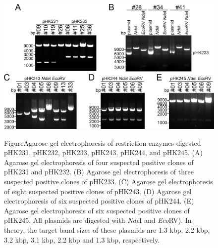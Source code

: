 \begin{figure}[hbtp!]
\centering
\graphicspath{{figures/}}
\includegraphics[width=\textwidth-50mm]{fig4-X.jpg}
{
 {Figure}{Agarose gel electrophoresis of restriction enzymes-digested pHK231, pHK232, pHK233, pHK243, pHK244, and pHK245. (A) Agarose gel electrophoresis of four suspected positive clones of pHK231 and pHK232. (B) Agarose gel electrophoresis of three suspected positive clones of pHK233. (C) Agarose gel electrophoresis of eight suspected positive clones of pHK243. (D) Agarose gel electrophoresis of six suspected positive clones of pHK244. (E) Agarose gel electrophoresis of six suspected positive clones of pHK245. All plasmids are digested with \textit{Nde}I and \textit{Eco}RV). In theory, the target band sizes of these plasmids are 1.3 kbp, 2.2 kbp, 3.2 kbp, 3.1 kbp, 2.2 kbp and 1.3 kbp, respectively.}
\par}
\end{figure}

